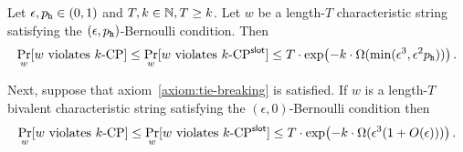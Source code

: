   \begin{theorem} \label{thm:main-mh-CP} Let
    $\epsilon, p_{\mathtt{h}} \in (0,1)$ and $T, k \in \mathbb{N}, T \geq k$. 
    Let $w$ be a length-$T$ characteristic string satisfying the $(\epsilon, p_{\mathtt{h}})$-Bernoulli condition. 
    Then
    $$
      \Pr_{w}[\text{$w$ violates ${k}\text{-}\mathrm{CP}$}] 
        \leq 
      \Pr_{w}[\text{$w$ violates ${k}\text{-}\mathrm{CP}^{\mathsf{slot}}$}] 
        \leq T \cdot 
        \exp\bigl(-k\cdot \Omega(\min(\epsilon^3, \epsilon^2 p_{\mathtt{h}}))\bigr)
        \,.
    $$
    
    Next, suppose that axiom~\ref{axiom:tie-breaking} is satisfied. 
    If $w$ is a length-$T$ bivalent characteristic string satisfying the $(\epsilon, 0)$-Bernoulli condition 
    then
    $$
      \Pr_{w}[\text{$w$ violates ${k}\text{-}\mathrm{CP}$}] 
        \leq 
      \Pr_{w}[\text{$w$ violates ${k}\text{-}\mathrm{CP}^{\mathsf{slot}}$}] 
        \leq T \cdot 
        \exp\bigl(-k \cdot \Omega(\epsilon^3 (1 + O(\epsilon)))\bigr)
        \,.
    $$
  \end{theorem}
